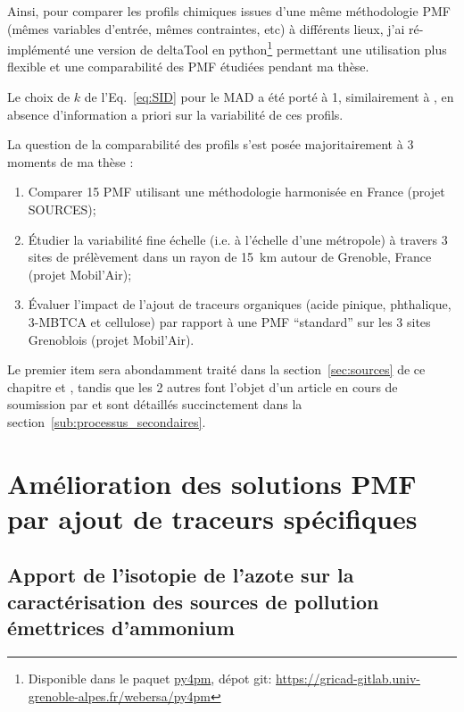 \begin{tcolorbox}[colback=red!5!white,colframe=Melon,title=Note]
    Ainsi, pour comparer les profils chimiques issues d'une même méthodologie PMF (mêmes
    variables d'entrée, mêmes contraintes, etc) à différents lieux, j'ai ré-implémenté une version
    de deltaTool en python\footnote{Disponible dans le paquet
        \href{https://pypi.org/project/py4pm/}{py4pm}, dépot git:
        \url{https://gricad-gitlab.univ-grenoble-alpes.fr/webersa/py4pm}
    } permettant une
    utilisation plus flexible et une comparabilité des PMF étudiées pendant ma thèse.

    Le choix de $k$ de l'Eq.~\ref{eq:SID} pour le MAD a été porté à 1, similairement à
    \cite{pernigottiDeltaSA2018}, en absence d'information a priori sur la variabilité de ces
    profils.
\end{tcolorbox}

La question de la comparabilité des profils s'est posée majoritairement à 3 moments de ma
thèse :
\begin{enumerate}
    \item Comparer 15 PMF utilisant une méthodologie harmonisée en France (projet SOURCES);
    \item Étudier la variabilité fine échelle (i.e. à l'échelle d'une métropole) à travers
        3 sites de prélèvement dans un rayon de \SI{15}{\kilo\m} autour de Grenoble, France
        (projet Mobil'Air);
    \item Évaluer l'impact de l'ajout de traceurs organiques (acide pinique, phthalique,
        3-MBTCA et cellulose) par rapport à une PMF ``standard'' sur les 3 sites
        Grenoblois (projet Mobil'Air).
\end{enumerate}

Le premier item sera abondamment traité dans la section~\ref{sec:sources} de ce chapitre et
\textcite{weberComparison2019}, tandis que les 2 autres font l'objet d'un article en
cours de soumission par \textcite{borlazaFinescaleinprep.} et sont détaillés succinctement
dans la section~\ref{sub:processus_secondaires}.

\section{Amélioration des solutions PMF par ajout de traceurs spécifiques}%
\label{sec:amélioration_des_solutions_pmf}

\subsection{Apport de l'isotopie de l'azote sur la caractérisation des sources de pollution émettrices d’ammonium}%
\label{sub:isotopie}

